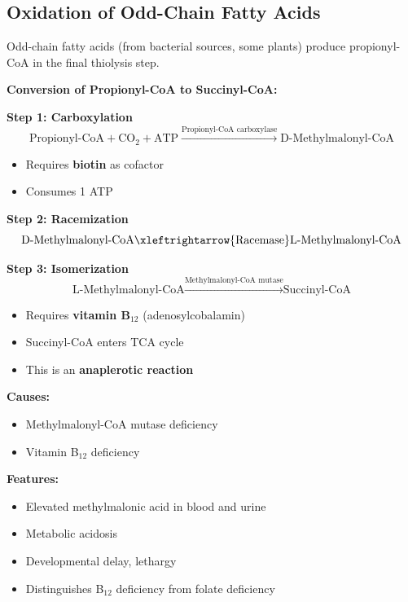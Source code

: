 \subsection{Oxidation of Odd-Chain Fatty Acids}

Odd-chain fatty acids (from bacterial sources, some plants) produce propionyl-CoA in the final thiolysis step.

\textbf{Conversion of Propionyl-CoA to Succinyl-CoA:}

\textbf{Step 1: Carboxylation}
\[
\text{Propionyl-CoA} + \text{CO}_2 + \text{ATP} \xrightarrow{\text{Propionyl-CoA carboxylase}} \text{D-Methylmalonyl-CoA}
\]
\begin{itemize}
    \item Requires \textbf{biotin} as cofactor
    \item Consumes 1 ATP
\end{itemize}

\textbf{Step 2: Racemization}
\[
\text{D-Methylmalonyl-CoA} \xleftrightarrow{\text{Racemase}} \text{L-Methylmalonyl-CoA}
\]

\textbf{Step 3: Isomerization}
\[
\text{L-Methylmalonyl-CoA} \xrightarrow{\text{Methylmalonyl-CoA mutase}} \text{Succinyl-CoA}
\]
\begin{itemize}
    \item Requires \textbf{vitamin B$_{12}$} (adenosylcobalamin)
    \item Succinyl-CoA enters TCA cycle
    \item This is an \textbf{anaplerotic reaction}
\end{itemize}

\begin{tcolorbox}[colback=red!5, colframe=red!70!black, title=\textbf{Clinical Correlation: Methylmalonic Acidemia}]
\textbf{Causes:}
\begin{itemize}
    \item Methylmalonyl-CoA mutase deficiency
    \item Vitamin B$_{12}$ deficiency
\end{itemize}

\textbf{Features:}
\begin{itemize}
    \item Elevated methylmalonic acid in blood and urine
    \item Metabolic acidosis
    \item Developmental delay, lethargy
    \item Distinguishes B$_{12}$ deficiency from folate deficiency
\end{itemize}
\end{tcolorbox}

